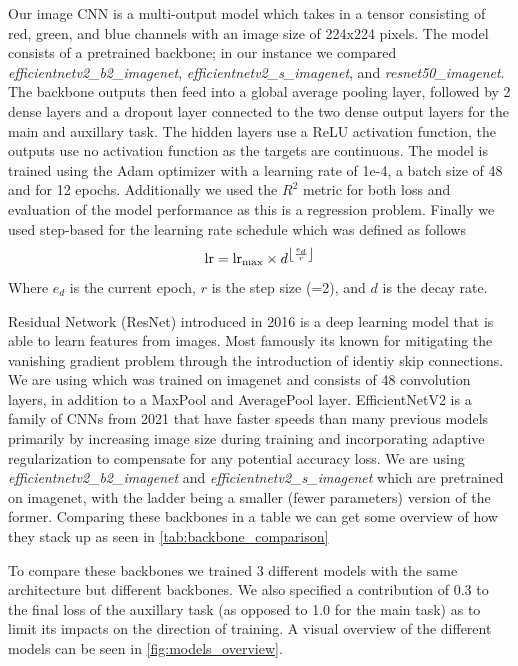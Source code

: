 \documentclass[12pt,a4paper,oneside]{article}
\begin{document}
Our image CNN is a multi-output model which takes in a tensor consisting of red, green, and blue channels with an image size of 224x224 pixels. The model consists of a pretrained backbone; in our instance we compared \textit{efficientnetv2\_b2\_imagenet}, \textit{efficientnetv2\_s\_imagenet}, and \textit{resnet50\_imagenet}. The backbone outputs then feed into a global average pooling layer, followed by 2 dense layers and a dropout layer connected to the two dense output layers for the main and auxillary task. The hidden layers use a ReLU activation function, the outputs use no activation function as the targets are continuous. The model is trained using the Adam optimizer with a learning rate of 1e-4, a batch size of 48 and for 12 epochs. Additionally we used the $R^2$ metric for both loss and evaluation of the model performance as this is a regression problem. Finally we used step-based for the learning rate schedule which was defined as follows
\[
    \text{lr} = \text{lr}_\text{max} \times d^{\floor*{\frac{e_d}{r}}}
\]
Where $e_d$ is the current epoch, $r$ is the step size (=2), and $d$ is the decay rate.

\smallskip
Residual Network (ResNet) \cite{he2016identity} introduced in 2016 is a deep learning model that is able to learn features from images. Most famously its known for mitigating the vanishing gradient problem through the introduction of identiy skip connections. We are using  which was trained on imagenet and consists of 48 convolution layers, in addition to a MaxPool and AveragePool layer. EfficientNetV2 \cite{tan2021efficientnetv2} is a family of CNNs from 2021 that have faster speeds than many previous models primarily by increasing image size during training and incorporating adaptive regularization to compensate for any potential accuracy loss. We are using \textit{efficientnetv2\_b2\_imagenet} and \textit{efficientnetv2\_s\_imagenet} which are pretrained on imagenet, with the ladder being a smaller (fewer parameters) version of the former. Comparing these backbones in a table we can get some overview of how they stack up as seen in \ref{tab:backbone_comparison}

To compare these backbones we trained 3 different models with the same architecture but different backbones. We also specified a contribution of 0.3 to the final loss of the auxillary task (as opposed to 1.0 for the main task) as to limit its impacts on the direction of training. A visual overview of the different models can be seen in \ref{fig:models_overview}. 
\end{document}
